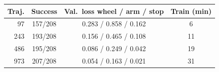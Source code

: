 \begin{tabular}{@{}rccc@{}}
\toprule
Traj. & Success & Val.\ loss wheel / arm / stop & Train (min) \\
\midrule
97 & 157/208 & 0.283 / 0.858 / 0.162 & 6 \\
243 & 193/208 & 0.156 / 0.465 / 0.108 & 11 \\
486 & 195/208 & 0.086 / 0.249 / 0.042 & 19 \\
973 & 207/208 & 0.054 / 0.163 / 0.021 & 31 \\
\bottomrule
\end{tabular}
